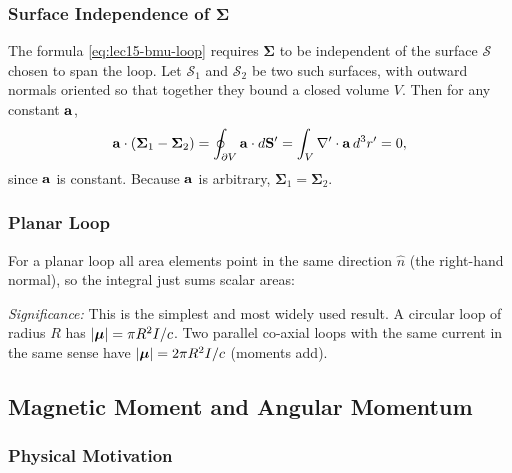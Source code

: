 \subsubsection*{Surface Independence of $\boldsymbol{\Sigma}$}

The formula \eqref{eq:lec15-bmu-loop} requires $\boldsymbol{\Sigma}$ to be
independent of the surface $\mathcal{S}$ chosen to span the loop.  Let
$\mathcal{S}_1$ and $\mathcal{S}_2$ be two such surfaces, with outward normals
oriented so that together they bound a closed volume $V$.  Then for any constant
$\mathbf{a}$,
\begin{equation}
  \mathbf{a}\cdot(\boldsymbol{\Sigma}_1 - \boldsymbol{\Sigma}_2)
  = \oint_{\partial V}\mathbf{a}\cdot d\mathbf{S}'
  = \int_V\nabla'\cdot\mathbf{a}\,d^3r' = 0,
\end{equation}
since $\mathbf{a}$ is constant.  Because $\mathbf{a}$ is arbitrary,
$\boldsymbol{\Sigma}_1 = \boldsymbol{\Sigma}_2$.

\subsubsection*{Planar Loop}

For a planar loop all area elements point in the same direction $\hat{n}$
(the right-hand normal), so the integral just sums scalar areas:


\textit{Significance:} This is the simplest and most widely used result.  A circular
loop of radius $R$ has $|\boldsymbol{\mu}| = \pi R^2 I/c$.  Two parallel co-axial loops with
the same current in the same sense have $|\boldsymbol{\mu}| = 2\pi R^2 I/c$ (moments add).

\subsection{Magnetic Moment and Angular Momentum}\label{subsec:lec15-angular-momentum}

\subsubsection*{Physical Motivation}

